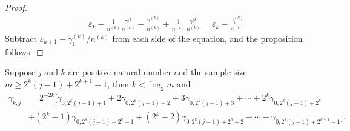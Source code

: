 \documentclass[11pt,english,a4paper]{article}
\begin{document}
\begin{prop}
\begin{proof}
\begin{align*}
&= \varepsilon_k - \frac{1}{n^{(k)}}\frac{\gamma^{(k}}{n^{(k)}}  - \frac{\gamma^{(k)}_1 }{n^{(k)}} + \frac{1}{n^{(k)}}\frac{\gamma^{(k}}{n^{(k)}} = \varepsilon_k - \frac{\gamma^{(k)}_1 }{n^{(k)}}
\end{align*}
Subtract $\varepsilon_{  k+1} - \gamma^{(k)}_1/n^{(k)}$ from each side of the equation, and the proposition follows.
\end{proof}
\end{prop}

\begin{lemma}
Suppose $j$ and $k$ are positive natural number and the sample size $m \geq 2^k(j-1) + 2^{k+1} - 1$, then $k < \log_2 m$ and
\begin{align}
\gamma_{  k,j} &= 2^{-2k} \Big[ \gamma_{0,2^k(j-1)+1} + 2\gamma_{0,2^k(j-1)+2} +3\gamma_{0,2^k(j-1)+3} + \cdots + 2^k\gamma_{0,2^k(j-1)+2^k} \nonumber \\
&+ (2^k -1) \gamma_{0,2^k(j-1)+2^k + 1} + (2^k -2) \gamma_{0,2^k(j-1)+2^k + 2} + \cdots + \gamma_{0,2^k(j-1)+2^{k+1} - 1} \Big] . \label{eq:hypothesis}
\end{align}
\end{lemma}
\end{document}
